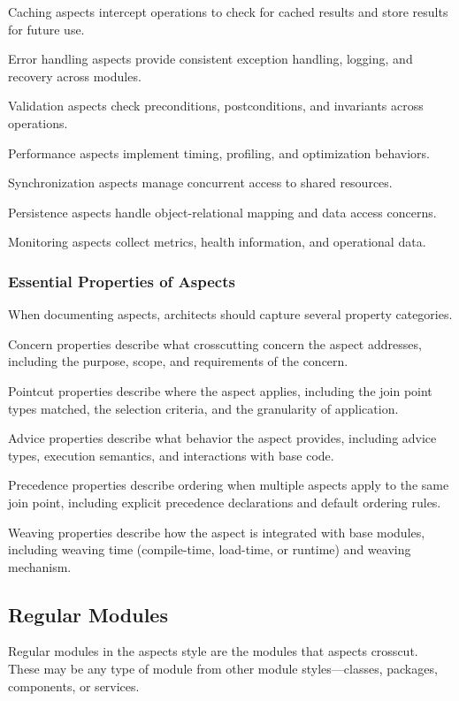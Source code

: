 \documentclass[11pt]{article}
\begin{document}
Caching aspects intercept operations to check for cached results and store results for future use.

Error handling aspects provide consistent exception handling, logging, and recovery across modules.

Validation aspects check preconditions, postconditions, and invariants across operations.

Performance aspects implement timing, profiling, and optimization behaviors.

Synchronization aspects manage concurrent access to shared resources.

Persistence aspects handle object-relational mapping and data access concerns.

Monitoring aspects collect metrics, health information, and operational data.

\subsubsection{Essential Properties of Aspects}

When documenting aspects, architects should capture several property categories.

Concern properties describe what crosscutting concern the aspect addresses, including the purpose, scope, and requirements of the concern.

Pointcut properties describe where the aspect applies, including the join point types matched, the selection criteria, and the granularity of application.

Advice properties describe what behavior the aspect provides, including advice types, execution semantics, and interactions with base code.

Precedence properties describe ordering when multiple aspects apply to the same join point, including explicit precedence declarations and default ordering rules.

Weaving properties describe how the aspect is integrated with base modules, including weaving time (compile-time, load-time, or runtime) and weaving mechanism.

\subsection{Regular Modules}

Regular modules in the aspects style are the modules that aspects crosscut. These may be any type of module from other module styles---classes, packages, components, or services.
\end{document}
